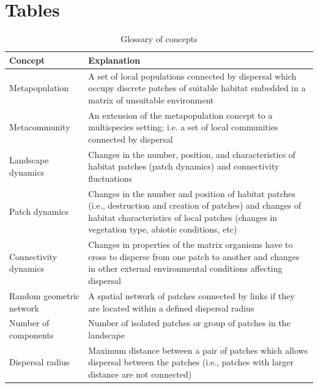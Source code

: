\documentclass[12pt]{article}
\begin{document}
\newpage



\section*{Tables}

\begin{table}[H]
\begin{tabular}{  p{6cm}  |  p{10cm} }
  \hline
  \textbf{Concept} & \textbf{Explanation}\\  \hline
  Metapopulation & A set of local populations connected by dispersal which occupy discrete patches of suitable habitat embedded in a matrix of unsuitable environment \\ \hline
  Metacommunity &  An extension of the metapopulation concept to a multispecies setting; 
  i.e. a set of local communities connected by dispersal \\ \hline  
  Landscape dynamics & Changes in the number, position, and characteristics of habitat patches (patch dynamics) and connectivity fluctuations \\ \hline
  Patch dynamics & Changes in the number and position of habitat patches (i.e., destruction and creation of patches) and changes of habitat 
  characteristics of local patches (changes in vegetation type, abiotic conditions, etc) \\ \hline
  Connectivity dynamics & Changes in properties of the matrix organisms have to cross 
to disperse from one patch to another and changes in other external environmental conditions affecting dispersal \\ \hline
  Random geometric network  & A spatial network of patches connected by links if they are located within a defined dispersal radius \\ \hline
 Number of components & Number of isolated patches or group of patches in the landscape \\ \hline
  Dispersal radius  & Maximum distance between a pair of patches which allows dispersal between the patches (i.e., patches with larger distance are not connected) \\ \hline
\end{tabular}
\label{table1}
\caption{Glossary of concepts}
\end{table}
\end{document}
